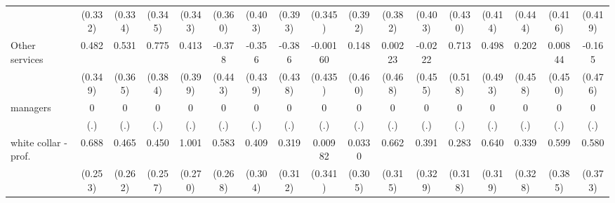 {\begin{tabular}{l*{16}{c}}
                    &     (0.332)         &     (0.334)         &     (0.345)         &     (0.343)         &     (0.360)         &     (0.403)         &     (0.393)         &     (0.345)         &     (0.392)         &     (0.382)         &     (0.403)         &     (0.430)         &     (0.414)         &     (0.444)         &     (0.416)         &     (0.419)         \\
[1em]
Other services      &       0.482         &       0.531         &       0.775\sym{*}  &       0.413         &      -0.378         &      -0.356         &      -0.386         &    -0.00160         &       0.148         &     0.00223         &     -0.0222         &       0.713         &       0.498         &       0.202         &     0.00844         &      -0.165         \\
                    &     (0.349)         &     (0.365)         &     (0.384)         &     (0.399)         &     (0.443)         &     (0.439)         &     (0.438)         &     (0.435)         &     (0.460)         &     (0.468)         &     (0.455)         &     (0.518)         &     (0.493)         &     (0.458)         &     (0.450)         &     (0.476)         \\
[1em]
managers            &           0         &           0         &           0         &           0         &           0         &           0         &           0         &           0         &           0         &           0         &           0         &           0         &           0         &           0         &           0         &           0         \\
                    &         (.)         &         (.)         &         (.)         &         (.)         &         (.)         &         (.)         &         (.)         &         (.)         &         (.)         &         (.)         &         (.)         &         (.)         &         (.)         &         (.)         &         (.)         &         (.)         \\
[1em]
white collar - prof.&       0.688\sym{**} &       0.465         &       0.450         &       1.001\sym{***}&       0.583\sym{*}  &       0.409         &       0.319         &     0.00982         &      0.0330         &       0.662\sym{*}  &       0.391         &       0.283         &       0.640\sym{*}  &       0.339         &       0.599         &       0.580         \\
                    &     (0.253)         &     (0.262)         &     (0.257)         &     (0.270)         &     (0.268)         &     (0.304)         &     (0.312)         &     (0.341)         &     (0.305)         &     (0.315)         &     (0.329)         &     (0.318)         &     (0.319)         &     (0.328)         &     (0.385)         &     (0.373)         \\

\end{tabular}}
